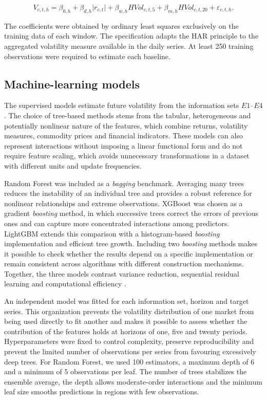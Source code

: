 \documentclass[a4paper,fleqn]{cas-sc}
\begin{document}
\begin{equation}
V_{c,t,h}
=
\beta_{0,h}
+\beta_{d,h}\lvert r_{c,t}\rvert
+\beta_{w,h}HVol_{c,t,5}
+\beta_{m,h}HVol_{c,t,20}
+\varepsilon_{c,t,h}.
\label{eq:har}
\end{equation}

The coefficients were obtained by ordinary least squares exclusively on the training data of each window. The specification adapts the HAR principle to the aggregated volatility measure available in the daily series. At least 250 training observations were required to estimate each baseline.

\subsection{Machine-learning models}
\label{subsec:ml_models}

The supervised models estimate future volatility from the information sets \(E1\)--\(E4\). The choice of tree-based methods stems from the tabular, heterogeneous and potentially nonlinear nature of the features, which combine returns, volatility measures, commodity prices and financial indicators. These models can also represent interactions without imposing a linear functional form and do not require feature scaling, which avoids unnecessary transformations in a dataset with different units and update frequencies.

Random Forest was included as a \textit{bagging} benchmark. Averaging many trees reduces the instability of an individual tree and provides a robust reference for nonlinear relationships and extreme observations. XGBoost was chosen as a gradient \textit{boosting} method, in which successive trees correct the errors of previous ones and can capture more concentrated interactions among predictors. LightGBM extends this comparison with a histogram-based \textit{boosting} implementation and efficient tree growth. Including two \textit{boosting} methods makes it possible to check whether the results depend on a specific implementation or remain consistent across algorithms with different construction mechanisms. Together, the three models contrast variance reduction, sequential residual learning and computational efficiency \citep{Breiman2001RandomForest,ChenGuestrin2016XGBoost,Ke2017LightGBM}.

An independent model was fitted for each information set, horizon and target series. This organization prevents the volatility distribution of one market from being used directly to fit another and makes it possible to assess whether the contribution of the features holds at horizons of one, five and twenty periods. Hyperparameters were fixed to control complexity, preserve reproducibility and prevent the limited number of observations per series from favouring excessively deep trees. For Random Forest, we used 100 estimators, a maximum depth of 6 and a minimum of 5 observations per leaf. The number of trees stabilizes the ensemble average, the depth allows moderate-order interactions and the minimum leaf size smooths predictions in regions with few observations.
\end{document}
